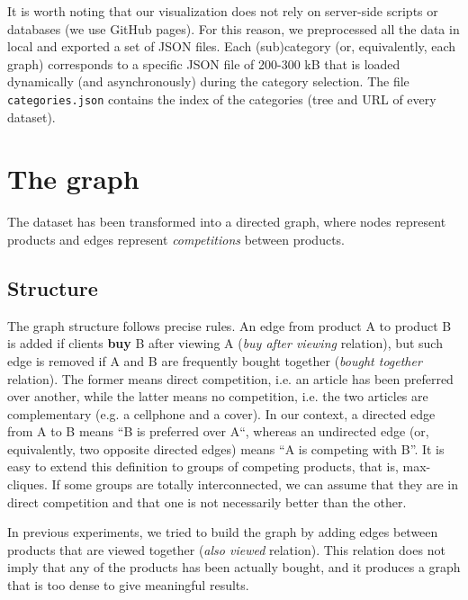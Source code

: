 \documentclass[a4paper,12pt]{article}
\begin{document}
It is worth noting that our visualization does not rely on server-side scripts or databases (we use GitHub pages). For this reason, we preprocessed all the data in local and exported a set of JSON files. Each (sub)category (or, equivalently, each graph) corresponds to a specific JSON file of 200-300 kB that is loaded dynamically (and asynchronously) during the category selection. The file \texttt{categories.json} contains the index of the categories (tree and URL of every dataset).

\section{The graph}
\label{sec:graph}
The dataset has been transformed into a directed graph, where nodes represent products and edges represent \textit{competitions} between products. 
\subsection{Structure}
The graph structure follows precise rules. An edge from product A to product B is added if clients \textbf{buy} B after viewing A (\textit{buy after viewing} relation), but such edge is removed if A and B are frequently bought together (\textit{bought together} relation). The former means direct competition, i.e. an article has been preferred over another, while the latter means no competition, i.e. the two articles are complementary (e.g. a cellphone and a cover). In our context, a directed edge from A to B means ``B is preferred over A``, whereas an undirected edge (or, equivalently, two opposite directed edges) means ``A is competing with B''. It is easy to extend this definition to groups of competing products, that is, max-cliques. If some groups are totally interconnected, we can assume that they are in direct competition and that one is not necessarily better than the other. 

In previous experiments, we tried to build the graph by adding edges between products that are viewed together (\textit{also viewed} relation). This relation does not imply that any of the products has been actually bought, and it produces a graph that is too dense to give meaningful results.
\end{document}
